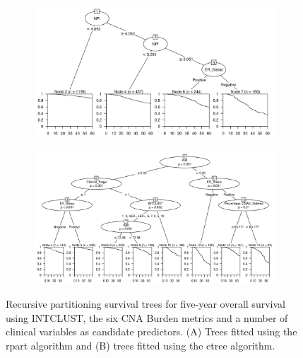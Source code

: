 \begin{figure}[!htb]
\centering

\vspace{1cm}

\begin{subfigure}{\textwidth}
\subcaption{}
\includegraphics[width=1\textwidth]{../figures/Appendices/Appendix_B/Clin_PartyKit_Survival_Burden_FiveYearOS_INTCLUST.png}
\end{subfigure}

\vspace{2cm}

\begin{subfigure}{\textwidth}
\subcaption{}
\includegraphics[width=1\textwidth]{../figures/Appendices/Appendix_B/Clin_Ctree_Survival_Burden_FiveYearOS_INTCLUST.png}
\end{subfigure}

\vspace{1cm}

\caption[Recursive partitioning survival trees for five-year overall survival using INTCLUST, the six CNA Burden metrics and a number of clinical variables as candidate predictors.]{Recursive partitioning survival trees for five-year overall survival using INTCLUST, the six CNA Burden metrics and a number of clinical variables as candidate predictors. (A) Trees fitted using the rpart algorithm and (B) trees fitted using the ctree algorithm.}
\end{figure}

